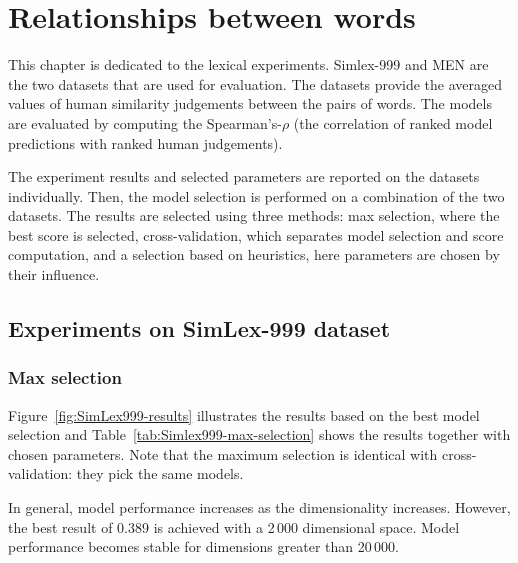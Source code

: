 \chapter{Relationships between words}
\label{sec:lexical}

This chapter is dedicated to the lexical experiments.\footnotemark{}
Simlex-999 \cite{hill2014simlex} and MEN \cite{Bruni:2014:MDS:2655713.2655714} are the two datasets that are used for evaluation. The datasets provide the averaged values of human similarity judgements between the pairs of words. The models are evaluated by computing the Spearman's-$\rho$ (the correlation of ranked model predictions with ranked human judgements).\footnotemark{}

The experiment results and selected parameters are reported on the datasets individually. Then, the model selection is performed on a combination of the two datasets. The results are selected using three methods: max selection, where the best score is selected, cross-validation, which separates model selection and score computation, and a selection based on heuristics, here parameters are chosen by their influence.

\section{Experiments on SimLex-999 dataset}
\label{sec:simlex-999}

\subsection{Max selection}
\label{sec:max-selection-simlex}



Figure~\ref{fig:SimLex999-results} illustrates the results based on the best model selection and Table~\ref{tab:Simlex999-max-selection} shows the results together with chosen parameters. Note that the maximum selection is identical with cross-validation: they pick the same models.

In general, model performance increases as the dimensionality increases. However, the best result of 0.389 is achieved with a 2\,000 dimensional space. Model performance becomes stable for dimensions greater than 20\,000.

